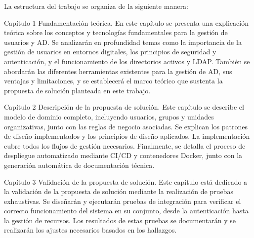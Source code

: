 
La estructura del trabajo se organiza de la siguiente manera:

Capítulo 1 Fundamentación teórica. En este capítulo se presenta una explicación teórica sobre los conceptos y tecnologías fundamentales para la gestión de usuarios y AD. Se analizarán en profundidad temas como la importancia de la gestión de usuarios en entornos digitales, los principios de seguridad y autenticación, y el funcionamiento de los directorios activos y LDAP. También se abordarán las diferentes herramientas existentes para la gestión de AD, sus ventajas y limitaciones, y se establecerá el marco teórico que sustenta la propuesta de solución planteada en este trabajo.

Capítulo 2 Descripción de la propuesta de solución. Este capítulo se describe el modelo de dominio completo, incluyendo usuarios, grupos y unidades organizativas, junto con las reglas de negocio asociadas. Se explican los patrones de diseño implementados y los principios de diseño aplicados. La implementación cubre todos los flujos de gestión necesarios. Finalmente, se detalla el proceso de despliegue automatizado mediante CI/CD y contenedores Docker, junto con la generación automática de documentación técnica.

Capítulo 3 Validación de la propuesta de solución. Este capítulo está dedicado a la validación de la propuesta de solución mediante la realización de pruebas exhaustivas. Se diseñarán y ejecutarán pruebas de integración para verificar el correcto funcionamiento del sistema en su conjunto, desde la autenticación hasta la gestión de recursos. Los resultados de estas pruebas se documentarán y se realizarán los ajustes necesarios basados en los hallazgos.
